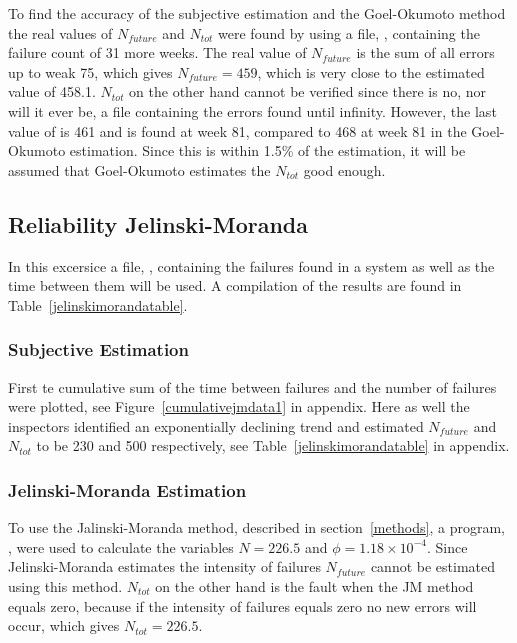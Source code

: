 \label{realdatago}
To find the accuracy of the subjective estimation and the Goel-Okumoto method the real values of $N_{future}$ and $N_{tot}$ were found by using a file, , containing the failure count of 31 more weeks. 
The real value of $N_{future}$ is the sum of all errors up to weak 75, which gives $N_{future}=459$, which is very close to the estimated value of 458.1. $N_{tot}$ on the other hand cannot be verified since there is no, nor will it ever be, a file containing the errors found until infinity. However, the last value of  is 461 and is found at week 81, compared to 468 at week 81 in the Goel-Okumoto estimation. Since this is within 1.5\% of the estimation, it will be assumed that Goel-Okumoto estimates the $N_{tot}$ good enough.




\subsection{Reliability Jelinski-Moranda}
In this excersice a file, , containing the failures found in a system as well as the time between them will be used.
A compilation of the results are found in Table~\ref{jelinskimorandatable}.

\subsubsection*{Subjective Estimation} 
First te cumulative sum of the time between failures and the number of failures were plotted, see Figure~\ref{cumulativejmdata1} in appendix. Here as well the inspectors identified an exponentially declining trend and estimated $N_{future}$ and $N_{tot}$ to be 230 and 500 respectively, see Table~\ref{jelinskimorandatable} in appendix.

\subsubsection*{Jelinski-Moranda Estimation}

To use the Jalinski-Moranda method, described in section~\ref{methods}, a program, , were used to calculate the variables $N=226.5$ and $\phi=1.18\times10^{-4}$. Since Jelinski-Moranda estimates the intensity of failures $N_{future}$ cannot be estimated using this method.
$N_{tot}$ on the other hand is the fault when the JM method equals zero, because if the intensity of failures equals zero no new errors will occur, which gives $N_{tot}=226.5$.


